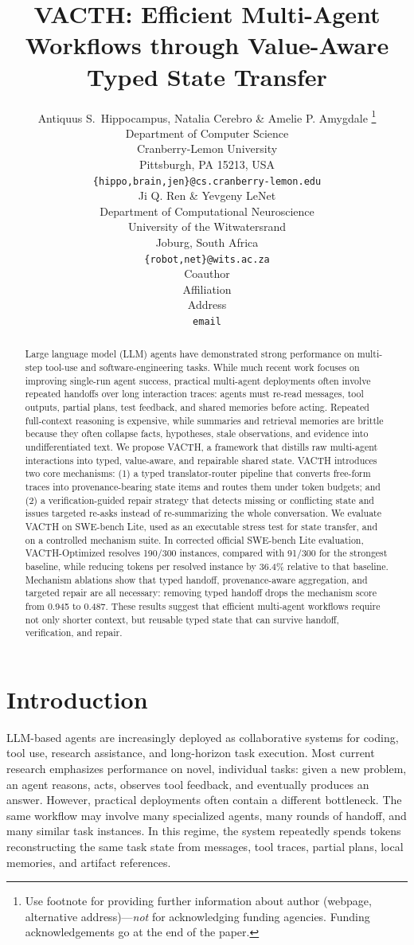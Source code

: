 \documentclass{article} %
\title{VACTH: Efficient Multi-Agent Workflows through Value-Aware Typed State Transfer}
\author{Antiquus S.~Hippocampus, Natalia Cerebro \& Amelie P. Amygdale \thanks{ Use footnote for providing further information
about author (webpage, alternative address)---\emph{not} for acknowledging
funding agencies.  Funding acknowledgements go at the end of the paper.} \\
Department of Computer Science\\
Cranberry-Lemon University\\
Pittsburgh, PA 15213, USA \\
\texttt{\{hippo,brain,jen\}@cs.cranberry-lemon.edu} \\
\And
Ji Q. Ren \& Yevgeny LeNet \\
Department of Computational Neuroscience \\
University of the Witwatersrand \\
Joburg, South Africa \\
\texttt{\{robot,net\}@wits.ac.za} \\
\AND
Coauthor \\
Affiliation \\
Address \\
\texttt{email}
}
\begin{document}
\maketitle

\begin{abstract}
Large language model (LLM) agents have demonstrated strong performance on multi-step tool-use and software-engineering tasks. While much recent work focuses on improving single-run agent success, practical multi-agent deployments often involve repeated handoffs over long interaction traces: agents must re-read messages, tool outputs, partial plans, test feedback, and shared memories before acting. Repeated full-context reasoning is expensive, while summaries and retrieval memories are brittle because they often collapse facts, hypotheses, stale observations, and evidence into undifferentiated text. We propose VACTH, a framework that distills raw multi-agent interactions into typed, value-aware, and repairable shared state. VACTH introduces two core mechanisms: (1) a typed translator-router pipeline that converts free-form traces into provenance-bearing state items and routes them under token budgets; and (2) a verification-guided repair strategy that detects missing or conflicting state and issues targeted re-asks instead of re-summarizing the whole conversation. We evaluate VACTH on SWE-bench Lite, used as an executable stress test for state transfer, and on a controlled mechanism suite. In corrected official SWE-bench Lite evaluation, VACTH-Optimized resolves 190/300 instances, compared with 91/300 for the strongest baseline, while reducing tokens per resolved instance by 36.4\% relative to that baseline. Mechanism ablations show that typed handoff, provenance-aware aggregation, and targeted repair are all necessary: removing typed handoff drops the mechanism score from 0.945 to 0.487. These results suggest that efficient multi-agent workflows require not only shorter context, but reusable typed state that can survive handoff, verification, and repair.
\end{abstract}

\section{Introduction}
LLM-based agents are increasingly deployed as collaborative systems for coding, tool use, research assistance, and long-horizon task execution. Most current research emphasizes performance on novel, individual tasks: given a new problem, an agent reasons, acts, observes tool feedback, and eventually produces an answer. However, practical deployments often contain a different bottleneck. The same workflow may involve many specialized agents, many rounds of handoff, and many similar task instances. In this regime, the system repeatedly spends tokens reconstructing the same task state from messages, tool traces, partial plans, local memories, and artifact references.
\end{document}
